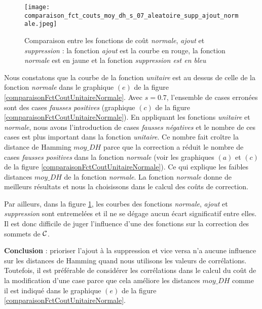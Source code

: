 \vspace{-0.5cm}
\begin{figure}[htb!] 
\centering
\texttt{[image: comparaison\_fct\_couts\_moy\_dh\_s\_07\_aleatoire\_supp\_ajout\_normale.jpeg]}
\caption{ Comparaison entre les fonctions de co\^ut {\em normale},  {\em ajout} et  {\em suppression} : la fonction {\em ajout} est la courbe en rouge, la fonction {\em normale} est en jaune et la fonction {\em suppression est en bleu}}
\label{comparaisonFctCoutNormaleAjoutSuppression} 
\end{figure}
 \FloatBarrier
Nous constatons que la courbe de la fonction {\em unitaire} est au dessus de celle de la fonction {\em normale} dans le graphique $(e)$ de la figure \ref{comparaisonFctCoutUnitaireNormale}.
Avec $s=0.7$, l'ensemble de cases erron\'ees sont des cases {\em fausses positives} (graphique $(c)$ de la figure \ref{comparaisonFctCoutUnitaireNormale}).
En appliquant les fonctions {\em unitaire} et {\em normale}, nous avons l'introduction de cases {\em fausses n\'egatives} et le nombre de ces cases est plus important dans la fonction {\em unitaire}. Ce nombre fait cro\^itre la distance de Hamming $moy\_DH$ parce que la correction a r\'eduit le nombre de cases {\em fausses positives} dans la fonction {\em normale} (voir les graphiques $(a)$ et $(c)$ de la figure  \ref{comparaisonFctCoutUnitaireNormale}).
Ce qui explique les faibles distances $moy\_DH$ de la fonction {\em normale}. La fonction {\em normale} donne de meilleurs r\'esultats et nous la choisissons dans le calcul des co\^uts de correction.
\newline

Par ailleurs, dans la figure \ref{comparaisonFctCoutNormaleAjoutSuppression}, les courbes des  fonctions  {\em normale}, {\em ajout} et {\em suppression} sont entremel\'ees et il ne se d\'egage aucun \'ecart significatif entre elles. Il est donc difficile de juger l'influence d'une des fonctions sur la correction des sommets de $\cal C$.  
\newline 

{\bf Conclusion} :
 prioriser l'ajout \`a la suppression et vice versa n'a aucune influence sur les distances de Hamming quand nous utilisons les valeurs de corr\'elations. Toutefois,  il est pr\'ef\'erable de consid\'erer les corr\'elations dans le calcul du co\^ut de la modification d'une case parce que cela am\'eliore les distances $moy\_DH$ comme il est indiqu\'e dans le graphique $(e)$  de la figure \ref{comparaisonFctCoutUnitaireNormale}.